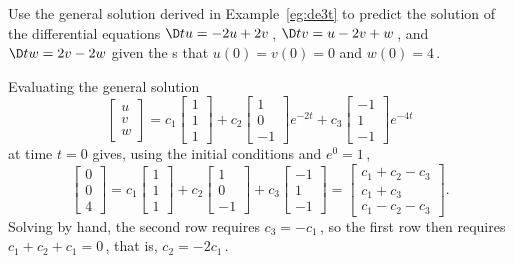 \begin{example} \label{eg:}
Use the general solution derived in Example~\ref{eg:de3t} to predict the solution of the differential equations \(\D tu=-2u+2v\)\,, \(\D tv=u-2v+w\)\,, and \(\D tw=2v-2w\) given the s that \(u(0)=v(0)=0\) and \(w(0)=4\)\,.
\begin{solution} 
Evaluating the general solution
\begin{equation*}
\begin{bmatrix} u\\v\\w \end{bmatrix}
=c_1\begin{bmatrix} 1\\1\\1 \end{bmatrix}
+c_2\begin{bmatrix} 1\\0\\-1 \end{bmatrix}e^{-2t}
+c_3\begin{bmatrix} -1\\1\\-1 \end{bmatrix}e^{-4t}
\end{equation*}
at time \(t=0\) gives, using the initial conditions and \(e^0=1\)\,,
\begin{equation*}
\begin{bmatrix} 0\\0\\4 \end{bmatrix}
=c_1\begin{bmatrix} 1\\1\\1 \end{bmatrix}
+c_2\begin{bmatrix} 1\\0\\-1 \end{bmatrix}
+c_3\begin{bmatrix} -1\\1\\-1 \end{bmatrix}
=\begin{bmatrix} c_1+c_2-c_3\\c_1+c_3\\c_1-c_2-c_3 \end{bmatrix}.
\end{equation*}
Solving by hand, the second row requires \(c_3=-c_1\)\,, so the first row then requires \(c_1+c_2+c_1=0\)\,, that is, \(c_2=-2c_1\)\,.

\end{solution}
\end{example}
